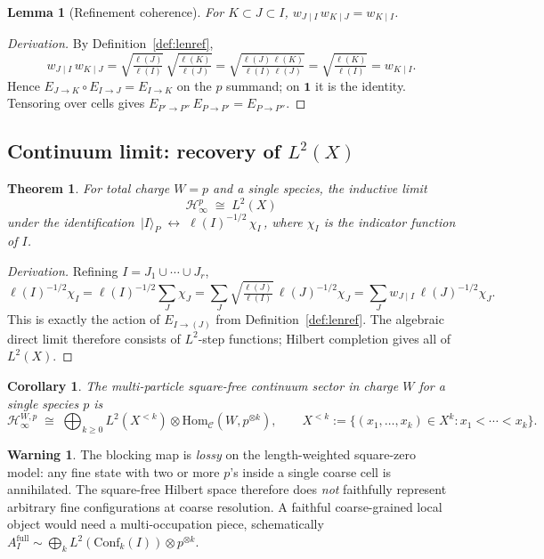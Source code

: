 \documentclass[11pt,a4paper]{article}
\newtheorem{lemma}[definition]{Lemma}
\newtheorem{theorem}[definition]{Theorem}
\newtheorem{corollary}[definition]{Corollary}
\theoremstyle{definition}
\newtheorem{warning}[definition]{Warning}
\newcommand{\Cc}{\mathcal{C}}
\newcommand{\Hh}{\mathcal{H}}
\newcommand{\Hom}{\mathrm{Hom}}
\newcommand{\Conf}{\mathrm{Conf}}
\newcommand{\one}{\mathbf{1}}
\begin{document}
\begin{lemma}[Refinement coherence]\label{lem:sqzero-coh}
For $K\subset J\subset I$,
$w_{J\mid I}\,w_{K\mid J} = w_{K\mid I}$.
\end{lemma}

\begin{proof}[Derivation]
By Definition~\ref{def:lenref},
\[
w_{J\mid I}\,w_{K\mid J}
= \sqrt{\tfrac{\ell(J)}{\ell(I)}}\,\sqrt{\tfrac{\ell(K)}{\ell(J)}}
= \sqrt{\tfrac{\ell(J)\,\ell(K)}{\ell(I)\,\ell(J)}}
= \sqrt{\tfrac{\ell(K)}{\ell(I)}}
= w_{K\mid I}.
\]
Hence $E_{J\to K}\circ E_{I\to J} = E_{I\to K}$ on the $p$ summand; on
$\one$ it is the identity. Tensoring over cells gives
$E_{P'\to P''}\,E_{P\to P'} = E_{P\to P''}$.
\end{proof}

\subsection{Continuum limit: recovery of $L^{2}(X)$}

\begin{theorem}\label{thm:L2}
For total charge $W = p$ and a single species, the inductive limit
\[
\Hh_\infty^{p} \;\cong\; L^{2}(X)
\]
under the identification $\,|I\rangle_P \;\longleftrightarrow\;
\ell(I)^{-1/2}\,\chi_I\,$, where $\chi_I$ is the indicator function of $I$.
\end{theorem}

\begin{proof}[Derivation]
Refining $I = J_1\cup\cdots\cup J_r$,
\[
\ell(I)^{-1/2}\chi_I
= \ell(I)^{-1/2}\sum_J \chi_J
= \sum_J \sqrt{\tfrac{\ell(J)}{\ell(I)}}\,\ell(J)^{-1/2}\chi_J
= \sum_J w_{J\mid I}\,\ell(J)^{-1/2}\chi_J.
\]
This is exactly the action of $E_{I\to(J)}$ from
Definition~\ref{def:lenref}. The algebraic direct limit therefore consists of
$L^{2}$-step functions; Hilbert completion gives all of $L^{2}(X)$.
\end{proof}

\begin{corollary}\label{cor:multipart-L2}
The multi-particle square-free continuum sector in charge $W$ for a single
species $p$ is
\[
\Hh_\infty^{W,p}
\;\cong\;
\bigoplus_{k\ge 0} L^{2}(X^{<k}) \otimes \Hom_\Cc(W, p^{\otimes k}),
\qquad
X^{<k} := \{ (x_1,\dots,x_k)\in X^{k} : x_1 < \cdots < x_k\}.
\]
\end{corollary}

\begin{warning}\label{warn:lossy}
The blocking map is \emph{lossy} on the length-weighted square-zero model:
any fine state with two or more $p$'s inside a single coarse cell is
annihilated. The square-free Hilbert space therefore does \emph{not}
faithfully represent arbitrary fine configurations at coarse resolution. A
faithful coarse-grained local object would need a multi-occupation piece,
schematically $A_I^{\text{full}}\sim \bigoplus_k L^{2}(\Conf_k(I))\otimes p^{\otimes k}$.
\end{warning}
\end{document}
